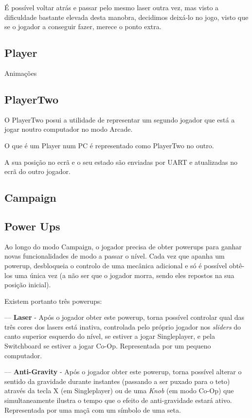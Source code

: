 \documentclass{report}
\begin{document}
É possível voltar atrás e passar pelo mesmo laser outra vez, mas visto a dificuldade bastante elevada desta manobra, decidimos deixá-lo no jogo, visto que se o jogador a conseguir fazer, merece o ponto extra.

\subsection{Player}

Animações

\subsection{PlayerTwo}

O PlayerTwo posui a utilidade de representar um segundo jogador que está a jogar noutro computador no modo Arcade. 

O que é um Player num PC é representado como PlayerTwo no outro.

A sua posição no ecrã e o seu estado são enviadas por UART e atualizadas no ecrã do outro jogador.

\subsection{Campaign}


\subsection{Power Ups}

Ao longo do modo Campaign, o jogador precisa de obter powerups para ganhar novas funcionalidades de modo a passar o nível. Cada vez que apanha um powerup, desbloqueia o controlo de uma mecânica adicional e só é possível obtê-los uma única vez (a não ser que o jogador morra, sendo eles repostos na sua posição inicial).

Existem portanto três powerups:
\newline

--- \textbf{Laser} - Após o jogador obter este powerup, torna possível controlar qual das três cores dos lasers está inativa, controlada pelo próprio jogador nos \textit{sliders} do canto superior esquerdo do nível, se estiver a jogar Singleplayer, e pela Switchboard se estiver a jogar Co-Op. Representada por um pequeno computador.

--- \textbf{Anti-Gravity} - Após o jogador obter este powerup, torna possível alterar o sentido da gravidade durante instantes (passando a ser puxado para o teto) através da tecla X (em Singleplayer) ou de uma \textit{Knob}  (em  modo Co-Op) que simultaneamente ilustra o tempo que o efeito de anti-gravidade estará ativo. Representada por uma maçã com um símbolo de uma seta.
\end{document}
